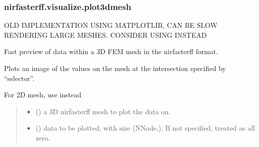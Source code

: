 \documentclass[letterpaper,10pt,english]{sphinxmanual}
\begin{document}
\sphinxstepscope


\subsubsection{nirfasterff.visualize.plot3dmesh}
\label{\detokenize{_autosummary/nirfasterff.visualize.plot3dmesh:nirfasterff-visualize-plot3dmesh}}\label{\detokenize{_autosummary/nirfasterff.visualize.plot3dmesh::doc}}

\begin{fulllineitems}
\label{\detokenize{_autosummary/nirfasterff.visualize.plot3dmesh:nirfasterff.visualize.plot3dmesh}}
\pysigstartsignatures
\pysiglinewithargsret
{}
{\sphinxparamcomma {}\sphinxparamcomma {}\sphinxparamcomma {}}
{}
\pysigstopsignatures
\sphinxAtStartPar
OLD IMPLEMENTATION USING MATPLOTLIB, CAN BE SLOW RENDERING LARGE MESHES.
CONSIDER USING  INSTEAD

\sphinxAtStartPar
Fast preview of data within a 3D FEM mesh in the nirfasterff format.

\sphinxAtStartPar
Plots an image of the values on the mesh at the intersection specified by “selector”.

\sphinxAtStartPar
For 2D mesh, use {\hyperref[\detokenize{_autosummary/nirfasterff.visualize.plotimage:nirfasterff.visualize.plotimage}]{}} instead
\begin{quote}\begin{description}
\begin{itemize}
\item {} 
\sphinxAtStartPar
{} () \textendash{} a 3D nirfasterff mesh to plot the data on.

\item {} 
\sphinxAtStartPar
{} (\sphinxstyleliteralemphasis{\sphinxupquote{, }}) \textendash{} data to be plotted, with size (NNode,). If not specified, treated as all zero.


\end{itemize}
\end{description}
\end{quote}
\end{fulllineitems}
\end{document}
